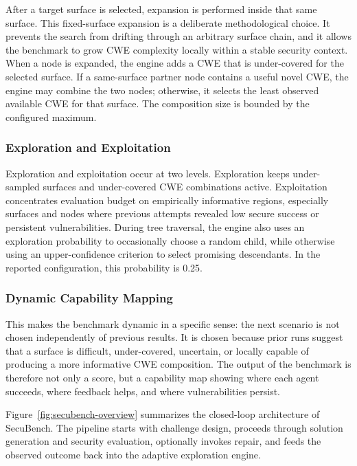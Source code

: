 \documentclass[11pt]{article}
\newcommand{\toolname}{SecuBench}
\begin{document}
After a target surface is selected, expansion is performed inside that same surface. This fixed-surface expansion is a deliberate methodological choice. It prevents the search from drifting through an arbitrary surface chain, and it allows the benchmark to grow CWE complexity locally within a stable security context. When a node is expanded, the engine adds a CWE that is under-covered for the selected surface. If a same-surface partner node contains a useful novel CWE, the engine may combine the two nodes; otherwise, it selects the least observed available CWE for that surface. The composition size is bounded by the configured maximum.

\subsubsection{Exploration and Exploitation}

Exploration and exploitation occur at two levels. Exploration keeps under-sampled surfaces and under-covered CWE combinations active. Exploitation concentrates evaluation budget on empirically informative regions, especially surfaces and nodes where previous attempts revealed low secure success or persistent vulnerabilities. During tree traversal, the engine also uses an exploration probability to occasionally choose a random child, while otherwise using an upper-confidence criterion to select promising descendants. In the reported configuration, this probability is 0.25.

\subsubsection{Dynamic Capability Mapping}

This makes the benchmark dynamic in a specific sense: the next scenario is not chosen independently of previous results. It is chosen because prior runs suggest that a surface is difficult, under-covered, uncertain, or locally capable of producing a more informative CWE composition. The output of the benchmark is therefore not only a score, but a capability map showing where each agent succeeds, where feedback helps, and where vulnerabilities persist.

Figure~\ref{fig:secubench-overview} summarizes the closed-loop architecture of \toolname{}. The pipeline starts with challenge design, proceeds through solution generation and security evaluation, optionally invokes repair, and feeds the observed outcome back into the adaptive exploration engine.
\end{document}
